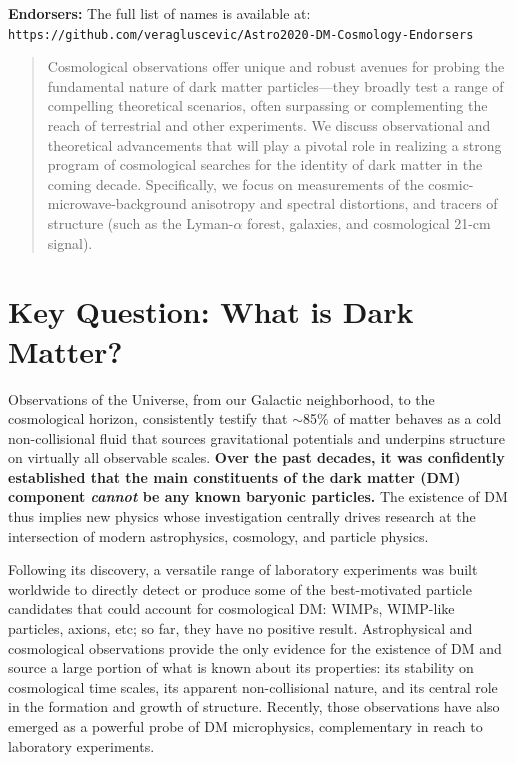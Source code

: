 \documentclass[12pt]{article}
\begin{document}
{\small \noindent\textbf{Endorsers:} The full list of names is available at:\\\texttt{https://github.com/veragluscevic/Astro2020-DM-Cosmology-Endorsers}}
\begin{abstract}
Cosmological observations offer unique and robust avenues for probing the fundamental nature of dark matter particles---they broadly test a range of compelling theoretical scenarios, often surpassing or complementing the reach of terrestrial and other experiments.
We discuss observational and theoretical advancements that will play a pivotal role in realizing a strong program of cosmological searches for the identity of dark matter in the coming decade. Specifically, we focus on measurements of the cosmic-microwave-background anisotropy and spectral distortions, and tracers of structure (such as the Lyman-$\alpha$ forest, galaxies, and cosmological 21-cm signal).
\end{abstract}

\pagebreak
\section{Key Question: What is Dark Matter?}
 
Observations of the Universe, from our Galactic neighborhood, to the cosmological horizon, consistently testify that $\sim$85$\%$ of matter behaves as a cold non-collisional fluid that sources gravitational potentials and underpins structure on virtually all observable scales.
\textbf{Over the past decades, it was confidently established that the main constituents of the dark matter (DM) component \textit{cannot} be any known baryonic particles.}
The existence of DM thus implies new physics whose investigation centrally drives research at the intersection of modern astrophysics, cosmology, and particle physics. 

Following its discovery, a versatile range of laboratory experiments was built worldwide to directly detect or produce some of the best-motivated particle candidates that could account for cosmological DM: WIMPs, WIMP-like particles, axions, etc; so far, they have no positive result.
Astrophysical and cosmological observations provide the only evidence for the existence of DM and source a large portion of what is known about its properties: its stability on cosmological time scales, its apparent non-collisional nature, and its central role in the formation and growth of structure.
Recently, those observations have also emerged as a powerful probe of DM microphysics, complementary in reach to laboratory experiments.
\end{document}
